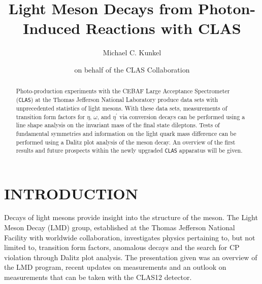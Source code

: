 \documentclass{aip-cp}
\begin{document}
\title{Light Meson Decays from Photon-Induced Reactions with CLAS}

\author[aff1,aff2]{Michael C. Kunkel }
\author[]{on behalf of the CLAS Collaboration }

\maketitle

\begin{abstract}
Photo-production experiments with the CEBAF Large Acceptance Spectrometer (\textsc{\texttt{CLAS}}) at the Thomas Jefferson National Laboratory produce data sets with unprecedented statistics of light mesons. With these data sets, measurements of transition form factors for $\eta$, $\omega$, and $\eta^\prime$ via conversion decays can be performed using a line shape analysis on the invariant mass of the final state dileptons. Tests of fundamental symmetries and information on the light quark mass difference can be performed using a Dalitz plot analysis of the meson decay. An overview of the first results and future prospects within the newly upgraded \textsc{\texttt{CLAS}} apparatus will be given.
\end{abstract}

\section{INTRODUCTION}
Decays of light mesons provide insight into the structure of the meson. The Light Meson Decay (LMD) group, established at the Thomas Jefferson National Facility with worldwide collaboration, investigates physics pertaining to, but not limited to, transition form factors, anomalous decays and the search for CP violation through Dalitz plot analysis. The presentation given was an overview of the LMD program, recent updates on measurements and an outlook on measurements that can be taken with the CLAS12 detector. 
\end{document}

